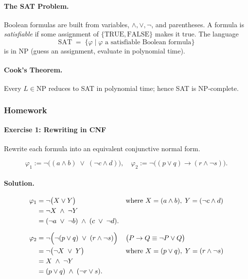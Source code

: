 \documentclass{article}
\theoremstyle{theorem}
\theoremstyle{definition}
\theoremstyle{remark}
\begin{document}
\paragraph{The SAT Problem.}  Boolean formulas are built from variables,
\(\land,\lor,\lnot\), and parentheses.  A formula is \emph{satisfiable} if
some assignment of \(\{\mathrm{TRUE},\mathrm{FALSE}\}\) makes it true.
The language
\[
  \mathrm{SAT}
  \;=\;
  \bigl\{\varphi\mid \varphi\text{ a satisfiable Boolean formula}\bigr\}
\]
is in \(\mathrm{NP}\) (guess an assignment, evaluate in polynomial time).
\paragraph{Cook’s Theorem.}  Every \(L\in\mathrm{NP}\) reduces to SAT in
polynomial time; hence SAT is NP‐complete.

\subsubsection{Homework}\label{sec:week8-9-exercises}

\paragraph*{Exercise 1: Rewriting in CNF}  
Rewrite each formula into an equivalent conjunctive normal form.

\[
\varphi_1 := \neg\bigl((a\land b)\;\lor\;(\neg c\land d)\bigr),
\quad
\varphi_2 := \neg\bigl((p\lor q)\to(r\land\neg s)\bigr).
\]

\paragraph{Solution.}
\[
\begin{aligned}
\varphi_1 
&= \neg\bigl(X\lor Y\bigr)
  &&\text{where }X=(a\land b),\;Y=(\neg c\land d)\\
&= \neg X\;\land\;\neg Y\\
&= (\neg a\;\lor\;\neg b)\;\land\;(c\;\lor\;\neg d).
\\[6pt]
\varphi_2 
&= \neg\Bigl(\neg(p\lor q)\;\lor\;(r\land\neg s)\Bigr)
  &&\bigl(P\to Q\equiv\neg P\lor Q\bigr)\\
&= \neg\bigl(\neg X\;\lor\;Y\bigr)
  &&\text{where }X=(p\lor q),\;Y=(r\land\neg s)\\
&= X\;\land\;\neg Y\\
&= (p\lor q)\;\land\;(\neg r\lor s).
\end{aligned}
\]
\end{document}

